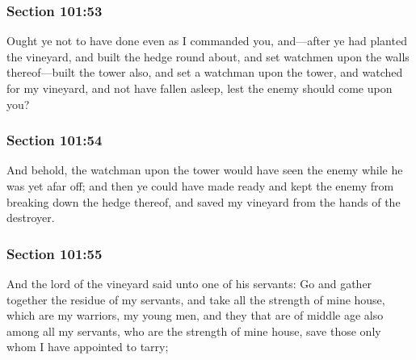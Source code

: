 	\subsubsection{Section 101:53} %
		\label{DC101-53}

		Ought ye not to have done even as I commanded you, and---after ye had planted the vineyard, and built the hedge round about, and set watchmen upon the walls thereof---built the tower also, and set a watchman upon the tower, and watched for my vineyard, and not have fallen asleep, lest the enemy should come upon you?


	\subsubsection{Section 101:54} %
		\label{DC101-54}

		And behold, the watchman upon the tower would have seen the enemy while he was yet afar off; and then ye could have made ready and kept the enemy from breaking down the hedge thereof, and saved my vineyard from the hands of the destroyer.


	\subsubsection{Section 101:55} %
		\label{DC101-55}

		And the lord of the vineyard said unto one of his servants: Go and gather together the residue of my servants, and take all the strength of mine house, which are my warriors, my young men, and they that are of middle age also among all my servants, who are the strength of mine house, save those only whom I have appointed to tarry;

